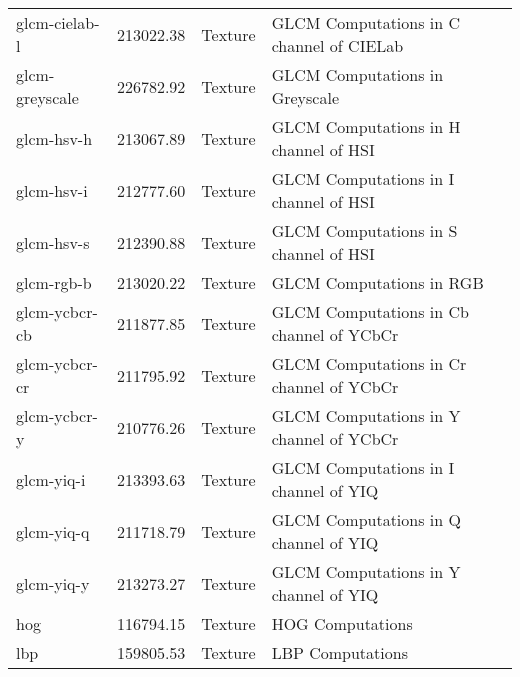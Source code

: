 \begin{longtable}{lrll}
glcm-cielab-l   &  213022.38 & Texture &  GLCM Computations in C channel of CIELab\\
glcm-greyscale  &  226782.92 & Texture &  GLCM Computations in Greyscale\\
glcm-hsv-h      &  213067.89 & Texture &  GLCM Computations in H channel of HSI\\
glcm-hsv-i      &  212777.60 & Texture & GLCM Computations in I channel of HSI\\
glcm-hsv-s      &  212390.88 & Texture & GLCM Computations in S channel of HSI\\
glcm-rgb-b      &  213020.22 & Texture & GLCM Computations in RGB\\
glcm-ycbcr-cb   &  211877.85 & Texture & GLCM Computations in Cb channel of YCbCr\\
glcm-ycbcr-cr   &  211795.92 & Texture & GLCM Computations in Cr channel of YCbCr\\
glcm-ycbcr-y    &  210776.26 & Texture & GLCM Computations in Y channel of YCbCr\\
glcm-yiq-i      &  213393.63 & Texture & GLCM Computations in I channel of YIQ\\
glcm-yiq-q      &  211718.79 & Texture & GLCM Computations in Q channel of YIQ\\
glcm-yiq-y      &  213273.27 & Texture & GLCM Computations in Y channel of YIQ\\
hog             &  116794.15 &  Texture & HOG Computations\\
lbp             &  159805.53 &  Texture & LBP Computations\\

\end{longtable}

